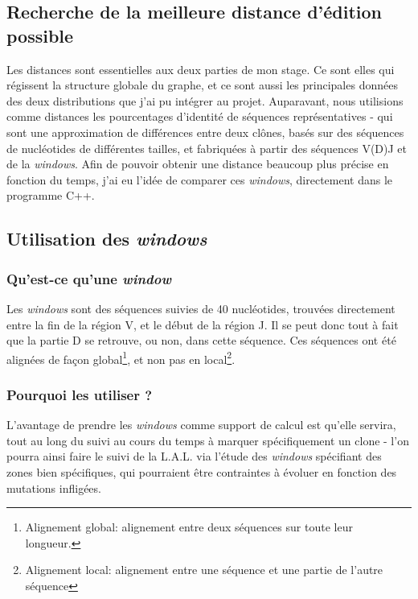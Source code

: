 \documentclass[12pt]{report}
\begin{document}
\begin{spacing}{1.2}
\chapter{Recherche de la meilleure distance d'édition possible}

Les distances sont essentielles aux deux parties de mon stage. Ce sont elles qui régissent la structure globale du graphe, et ce sont aussi les principales données des deux distributions que j'ai pu intégrer au projet.
\newline
Auparavant, nous utilisions comme distances les pourcentages d'identité de séquences représentatives - qui sont une approximation de différences entre deux clônes, basés sur des séquences de nucléotides de différentes tailles, et fabriquées à partir des séquences V(D)J et de la \textit{windows}.
\newline
Afin de pouvoir obtenir une distance beaucoup plus précise en fonction du temps, j'ai eu l'idée de comparer ces \textit{windows}, directement dans le programme C++.

\section{Utilisation des \textit{windows}}

\subsection{Qu'est-ce qu'une \textit{window}}

Les \textit{windows} sont des séquences suivies de 40 nucléotides, trouvées directement entre la fin de la région V, et le début de la région J. Il se peut donc tout à fait que la partie D se retrouve, ou non, dans cette séquence.
\newline
Ces séquences ont été alignées de façon global\footnote{Alignement global: alignement entre deux séquences sur toute leur longueur.}, et non pas en local\footnote{Alignement local: alignement entre une séquence et une partie de l'autre séquence}.

\subsection{Pourquoi les utiliser ?}

L'avantage de prendre les \textit{windows} comme support de calcul est qu'elle servira, tout au long du suivi au cours du temps à marquer spécifiquement un clone - l'on pourra ainsi faire le suivi de la L.A.L. via l'étude des \textit{windows} spécifiant des zones bien spécifiques, qui pourraient être contraintes à évoluer en fonction des mutations infligées.


\end{spacing}
\end{document}
